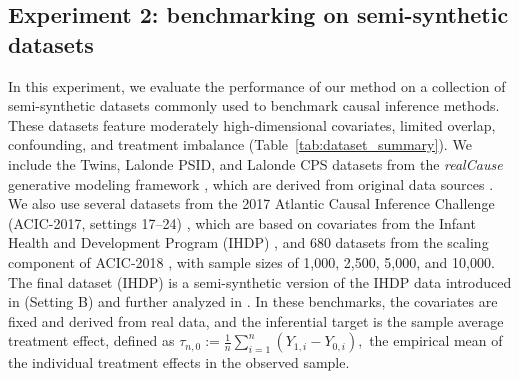 \documentclass[11pt]{article}
\theoremstyle{plain}
\begin{document}



 

\subsection{Experiment 2: benchmarking on semi-synthetic datasets}

 


In this experiment, we evaluate the performance of our method on a collection of semi-synthetic datasets commonly used to benchmark causal inference methods. These datasets feature moderately high-dimensional covariates, limited overlap, confounding, and treatment imbalance (Table~\ref{tab:dataset_summary}). We include the Twins, Lalonde PSID, and Lalonde CPS datasets from the \textit{realCause} generative modeling framework \citep{neal2020realcause}, which are derived from original data sources \citep{louizos2017causal, lalonde1986evaluating}. We also use several datasets from the 2017 Atlantic Causal Inference Challenge (ACIC-2017, settings 17–24) \citep{hahn2019atlantic}, which are based on covariates from the Infant Health and Development Program (IHDP) \citep{brooks1992effects}, and 680 datasets from the scaling component of ACIC-2018 \citep{shimoni2018benchmarking}, with sample sizes of 1{,}000, 2{,}500, 5{,}000, and 10{,}000. The final dataset (IHDP) is a semi-synthetic version of the IHDP data introduced in \cite{hill2011bayesian} (Setting B) and further analyzed in \cite{shalit2017estimating}. In these benchmarks, the covariates are fixed and derived from real data, and the inferential target is the sample average treatment effect, defined as $ \tau_{n,0}:= \frac{1}{n}\sum_{i=1}^n (Y_{1,i} - Y_{0,i}),$
the empirical mean of the individual treatment effects in the observed sample.
\end{document}
